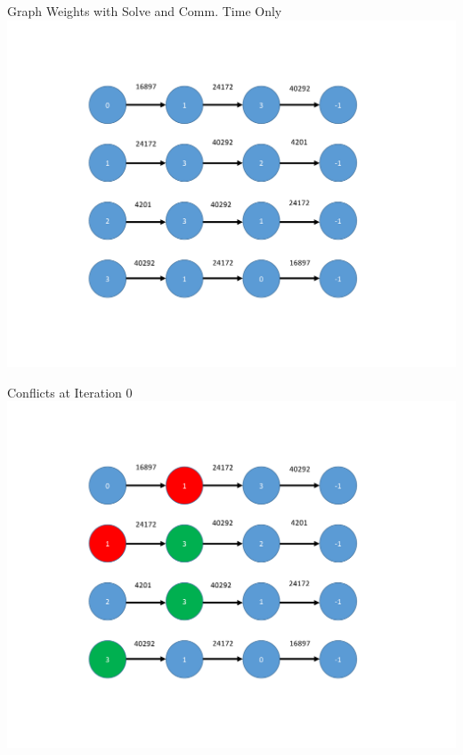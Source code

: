\documentclass[xcolor={usenames,dvipsnames,svgnames,table}]{beamer}
\begin{document}
\begin{frame}[t]{Graph Weights with Solve and Comm. Time Only}
\centering
\includegraphics[trim={2cm 2cm 4cm 2cm},clip,scale=0.45]{figures/solve_only.pdf}
\end{frame}

\begin{frame}[t]{Conflicts at Iteration 0}
\centering
\includegraphics[trim={2cm 2cm 4cm 2cm},clip,scale=0.45]{figures/solve_only_conflicts.pdf}
\end{frame}
\end{document}

